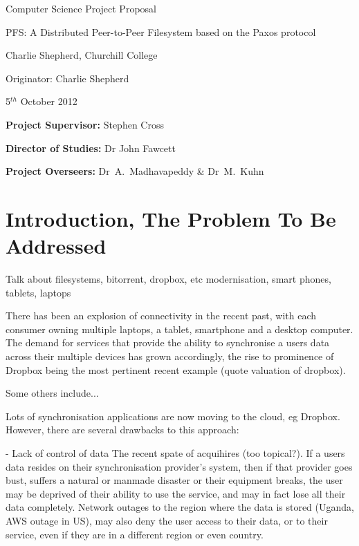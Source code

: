 \vfil

\centerline{\Large Computer Science Project Proposal}
\vspace{0.4in}
\centerline{\Large PFS: A Distributed Peer-to-Peer Filesystem based on the Paxos protocol}
\vspace{0.4in}
\centerline{\large Charlie Shepherd, Churchill College}
\vspace{0.3in}
\centerline{\large Originator: Charlie Shepherd}
\vspace{0.3in}
\centerline{\large 5$^{th}$ October 2012}

\vfil


\noindent
{\bf Project Supervisor:} Stephen Cross
\vspace{0.2in}

\noindent
{\bf Director of Studies:} Dr John Fawcett
\vspace{0.2in}
\noindent

\noindent
{\bf Project Overseers:} Dr~A.~Madhavapeddy \& Dr~M.~Kuhn



\section*{Introduction, The Problem To Be Addressed}

Talk about filesystems, bitorrent, dropbox, etc
modernisation, smart phones, tablets, laptops

There has been an explosion of connectivity in the recent past, with each consumer owning multiple
laptops, a tablet, smartphone and a desktop computer. The demand for services that provide the
ability to synchronise a users data across their multiple devices has grown accordingly, the rise
to prominence of Dropbox being the most pertinent recent example (quote valuation of dropbox).

Some others include...

Lots of synchronisation applications are now moving to the cloud, eg Dropbox. However, there are
several drawbacks to this approach:

- Lack of control of data
The recent spate of acquihires (too topical?).
If a users data resides on their synchronisation provider's system, then if that provider goes
bust, suffers a natural or manmade disaster or their equipment breaks, the user may be deprived of
their ability to use the service, and may in fact lose all their data completely. Network outages
to the region where the data is stored (Uganda, AWS outage in US), may also deny the user access
to their data, or to their service, even if they are in a different region or even country.


